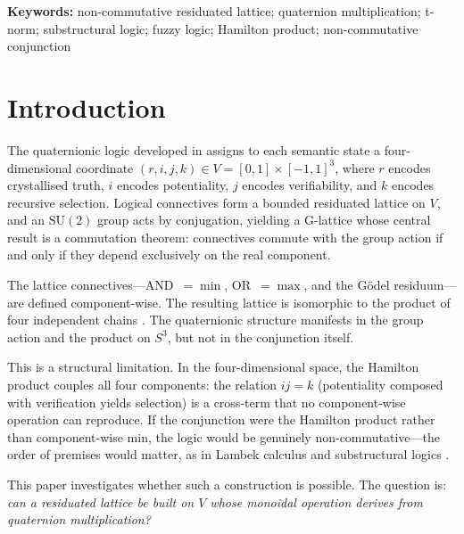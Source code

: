 \documentclass[11pt,a4paper]{article}
\newcommand{\SU}{\mathrm{SU}(2)}
\begin{document}
\begin{abstract}
An $\alpha$-parameterized family interpolates between the diagonal
product ($\alpha = 0$) and the full Hamilton product ($\alpha = 1$),
preserving all specializations; associativity holds only at the
endpoints.
\end{abstract}

\noindent\textbf{Keywords:} non-commutative residuated lattice;
quaternion multiplication; t-norm; substructural logic; fuzzy logic;
Hamilton product; non-commutative conjunction

\section{Introduction}
\label{sec:intro}

The quaternionic logic developed in \citet{p11} assigns to each
semantic state a four-dimensional coordinate
$(r, i, j, k) \in V = [0,1] \times [-1,1]^3$, where $r$ encodes
crystallised truth, $i$ encodes potentiality, $j$ encodes
verifiability, and $k$ encodes recursive selection. Logical connectives
form a bounded residuated lattice on $V$, and an $\SU$ group acts by
conjugation, yielding a G-lattice whose central result is a commutation
theorem: connectives commute with the group action if and only if they
depend exclusively on the real component.

The lattice connectives---AND~$= \min$, OR~$= \max$, and the G\"odel
residuum---are defined component-wise. The resulting lattice is
isomorphic to the product of four independent chains
\citep[Remark~5]{p11}. The quaternionic structure manifests in the group
action and the product on $S^3$, but not in the conjunction itself.

This is a structural limitation. In the four-dimensional space, the
Hamilton product couples all four components: the relation
$ij = k$ (potentiality composed with verification yields selection) is a
cross-term that no component-wise operation can reproduce. If the
conjunction were the Hamilton product rather than component-wise min, the
logic would be genuinely non-commutative---the order of premises would
matter, as in Lambek calculus \citep{lambek1958} and substructural
logics \citep{restall2000}.

This paper investigates whether such a construction is possible. The
question is: \emph{can a residuated lattice be built on $V$ whose
monoidal operation derives from quaternion multiplication?}
\end{document}
